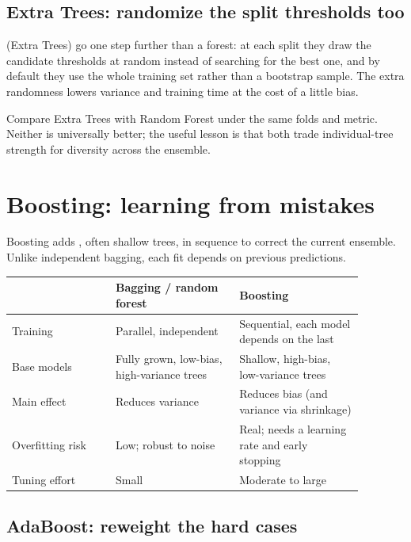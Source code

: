 \subsection{Extra Trees: randomize the split thresholds too}
\label{sec:extra-trees}

 (Extra Trees) go one step further than a forest: at each split they draw the candidate thresholds at random instead of searching for the best one, and by default they use the whole training set rather than a bootstrap sample. The extra randomness lowers variance and training time at the cost of a little bias.

Compare Extra Trees with Random Forest under the same folds and metric. Neither is universally better; the useful lesson is that both trade individual-tree strength for diversity across the ensemble.

\section{Boosting: learning from mistakes}

Boosting adds , often shallow trees, in sequence to correct the current ensemble. Unlike independent bagging, each fit depends on previous predictions.

\begin{mltable}
\begin{tabular}{@{}p{0.26\linewidth}p{0.31\linewidth}p{0.31\linewidth}@{}}
\toprule
\rowcolor{MLPaleBlue!92}
 & Bagging / random forest & Boosting \\
\midrule
Training & Parallel, independent & Sequential, each model depends on the last \\
Base models & Fully grown, low-bias, high-variance trees & Shallow, high-bias, low-variance trees \\
Main effect & Reduces variance & Reduces bias (and variance via shrinkage) \\
Overfitting risk & Low; robust to noise & Real; needs a learning rate and early stopping \\
Tuning effort & Small & Moderate to large \\
\bottomrule
\end{tabular}
\end{mltable}

\subsection{AdaBoost: reweight the hard cases}
\label{sec:adaboost}

